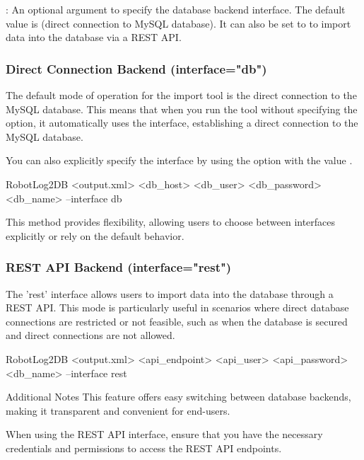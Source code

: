   : An optional argument to specify the database backend interface. 
  The default value is  (direct connection to MySQL database). 
  It can also be set to  to import data into the database via a REST API.

    \subsubsection{Direct Connection Backend (interface="db")}
    The default mode of operation for the import tool is the direct connection to the MySQL database. 
    This means that when you run the tool without specifying the  option, 
    it automatically uses the  interface, establishing a direct connection to the MySQL database.

    You can also explicitly specify the  interface by using the  
    option with the value . 

\begin{robotlog}
  RobotLog2DB <output.xml> <db\_host> <db\_user> <db\_password> <db\_name> --interface db
\end{robotlog}

    This method provides flexibility, allowing users to choose between interfaces explicitly 
    or rely on the default behavior.

    \subsubsection{REST API Backend (interface="rest")}
    The 'rest' interface allows users to import data into the database through a REST API. 
    This mode is particularly useful in scenarios where direct database connections are restricted 
    or not feasible, such as when the database is secured and direct connections are not allowed.

\begin{robotlog}
  RobotLog2DB <output.xml> <api\_endpoint> <api\_user> <api\_password> <db\_name> --interface rest
\end{robotlog}

\begin{boxhint} {Additional Notes}
  This feature offers easy switching between database backends, making it transparent and convenient for end-users.
  
  When using the REST API interface, ensure that you have the necessary credentials and permissions to access the REST API endpoints.
\end{boxhint}

